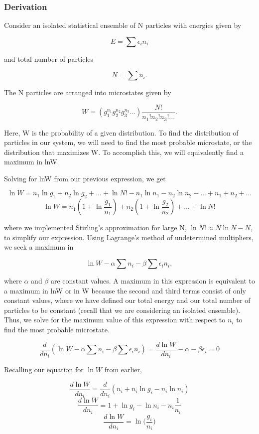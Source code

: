 \documentclass{article}
\begin{document}
\subsubsection{Derivation}

Consider an isolated statistical ensemble of N particles with energies given by

$$E = \sum \epsilon_i n_i$$

and total number of particles

$$N = \sum n_i.$$

The N particles are arranged into microstates given by

$$W = (g_1^{n_1} g_2^{n_2} g_3^{n_3} ...)\frac{N!}{n_1!n_2!n_3! ...}.$$

Here, W is the probability of a given distribution. To find the distribution of particles in our system, we will need to find the most probable microstate, or the distribution that maximizes W. To accomplish this, we will equivalently find a maximum in lnW.

Solving for lnW from our previous expression, we get

$$\ln W = n_1 \ln g_1 + n_2\ln g_2 + ... + \ln N! - n_1\ln n_1 - n_2\ln n_2 - ... + n_1 + n_2 + ...$$
$$\ln W = n_1(1 + \ln \frac{g_1}{n_1}) + n_2(1 + \ln \frac{g_2}{n_2}) + ... + \ln N!$$

where we implemented Stirling's approximation for large N, $\ln N! \approx N \ln N - N$, to simplify our expression. Using Lagrange's method of undetermined multipliers, we seek a maximum in

$$ \ln W - \alpha \sum n_i - \beta\sum\epsilon_in_i, $$

where $\alpha$ and $\beta$ are constant values. A maximum in this expression is equivalent to a maximum in lnW or in W because the second and third terms consist of only constant values, where we have defined our total energy and our total number of particles to be constant (recall that we are considering an isolated ensemble). Thus, we solve for the maximum value of this expression with respect to $n_i$ to find the most probable microstate.

$$ \frac{d}{d n_i} (\ln W - \alpha \sum n_i - \beta\sum\epsilon_in_i) = \frac{d \ln W}{dn_i} - \alpha - \beta\epsilon_i = 0 $$

Recalling our equation for $\ln W$ from earlier, 

$$ \frac{d\ln W}{dn_i} = \frac{d}{dn_i}(n_i + n_i \ln g_i - n_i \ln n_i) $$
$$ \frac{d \ln W }{dn_i} = 1 + \ln g_i - \ln n_i - n_i\frac{1}{n_i} $$
$$ \frac{d\ln W}{dn_i} = \ln \Big(\frac{g_i}{n_i}\Big) $$
\end{document}
